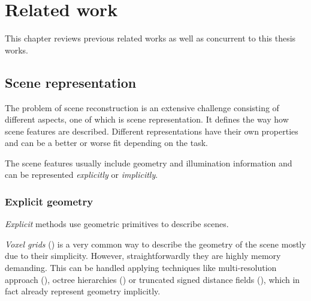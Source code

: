 \chapter{Related work}
\label{chap:related_work}


This chapter reviews previous related works as well as concurrent to this thesis works.




\section{Scene representation}

The problem of scene reconstruction is an extensive challenge consisting of different aspects,
one of which is scene representation.
It defines the way how scene features are described.
Different representations have their own properties and can be a better or worse fit depending on the task.

The scene features usually include geometry and illumination information
and can be represented \textit{explicitly} or \textit{implicitly}.

\subsection{Explicit geometry}

\textit{Explicit} methods use geometric primitives to describe scenes.

\textit{Voxel grids} (\cite{Lombardi_2019}) is a very common way to describe the geometry of the scene mostly due to their simplicity.
However, straightforwardly they are highly memory demanding.
This can be handled applying techniques like multi-resolution approach (\cite{häne2017hierarchical}), octree hierarchies (\cite{riegler2017octnet, tatarchenko2017octree})
or truncated signed distance fields (\cite{truncdistfield1996curless}),
which in fact already represent geometry implicitly.


